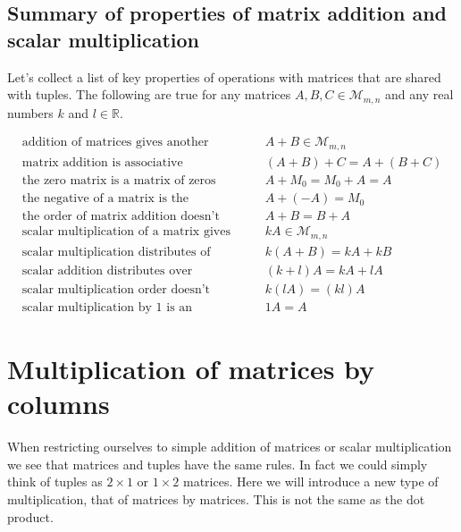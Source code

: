\subsection*{Summary of properties of matrix addition and scalar multiplication}

Let's collect a list of key properties of operations with matrices that are shared with tuples. The following are true for any matrices $A,B,C\in\mathcal{M}_{m,n}$ and any real numbers $k$ and $l\in\mathbb{R}$.

\begin{align*}
& \text{addition of matrices gives another matrix} && \quad A + B \in\mathcal{M}_{m,n} &\\
%
& \text{matrix addition is associative} && \quad (A + B) + C = A + (B + C) &\\
%
& \text{the zero matrix is a matrix of zeros} && \quad A + M_0 = M_0 + A = A &\\
%
& \text{the negative of a matrix is the additive inverse} && \quad A + (-A) = M_0 &\\
%
& \text{the order of matrix addition doesn't matter} && \quad A + B = B + A &\\
%
& \text{scalar multiplication of a matrix gives another matrix} && \quad kA\in\mathcal{M}_{m,n} &\\
%
& \text{scalar multiplication distributes of matrix addition} && \quad k(A+B)=kA+kB &\\
%
& \text{scalar addition distributes over matrix} && \quad (k+l)A=kA+lA &\\
%
& \text{scalar multiplication order doesn't matter} && \quad k(lA)=(kl)A &\\
%
& \text{scalar multiplication by 1 is an identity operation} && \quad 1A=A &
\end{align*}


\section{Multiplication of matrices by columns}

When restricting ourselves to simple addition of matrices or scalar multiplication we see that matrices and tuples have the same rules. In fact we could simply think of tuples as $2\times 1$ or $1\times 2$ matrices. Here we will introduce a new type of multiplication, that of matrices by matrices. This is not the same as the dot product.

